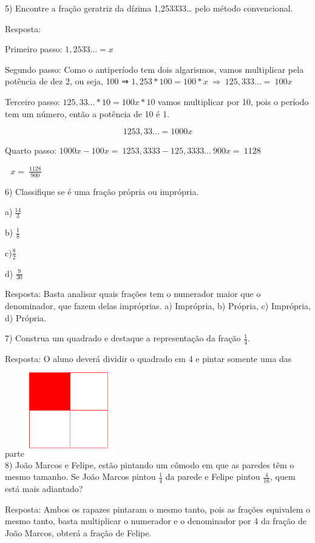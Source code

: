 {{{5) Encontre a fração geratriz da dízima 1,253333\ldots{} pelo método
convencional.

Resposta:

Primeiro passo: \(1,2533\ldots = x\)

Segundo passo: Como o antiperíodo tem dois algarismos, vamos multiplicar
pela potência de dez 2, ou seja, 100 ⇒
\(1,253*100 = 100*x\  \Rightarrow \ 125,333\ldots = \ 100x\)

Terceiro passo: \(125,33\ldots*10 = 100x*10\) vamos multiplicar por 10,
pois o período tem um número, então a potência de 10 é 1.

\[1253,33\ldots = 1000x\]

Quarto passo:
\(1000x - 100x = \ 1253,3333 - 125,3333\ldots\ 900x = \ 1128\)

\(\text{\ \ \ \ \ \ \ \ \ \ \ \ \ \ \ \ \ \ \ \ \ \ \ \ \ \ \ \ \ \ \ \ \ \ \ \ \ \ \ \ \ \ \ \ \ \ \ \ \ \ \ \ \ \ }x = \ \frac{1128}{900}\)

6) Classifique se é uma fração própria ou imprópria.

a)\(\ \frac{14}{3}\)

b) \(\frac{1}{8}\)

c)\(\frac{8}{2}\)

d) \(\frac{9}{30}\)

Resposta: Basta analisar quais frações tem o numerador maior que o
denominador, que fazem delas impróprias. a) Imprópria, b) Própria, c)
Imprópria, d) Própria.

7) Construa um quadrado e destaque a representação da fração
\(\frac{1}{4}\).

Resposta: O aluno deverá dividir o quadrado em 4 e pintar somente uma
das
parte\includegraphics[width=1.60536in,height=1.56845in]{./imgSAEB_7_MAT/media/image9.png}\\
8) João Marcos e Felipe, estão pintando um cômodo em que as paredes têm
o mesmo tamanho. Se João Marcos pintou \(\frac{1}{4}\) da parede e
Felipe pintou \(\frac{4}{16}\), quem está mais adiantado?

Resposta: Ambos os rapazes pintaram o mesmo tanto, pois as frações
equivalem o mesmo tanto, basta multiplicar o numerador e o denominador
por 4 da fração de João Marcos, obterá a fração de Felipe.

}}}
